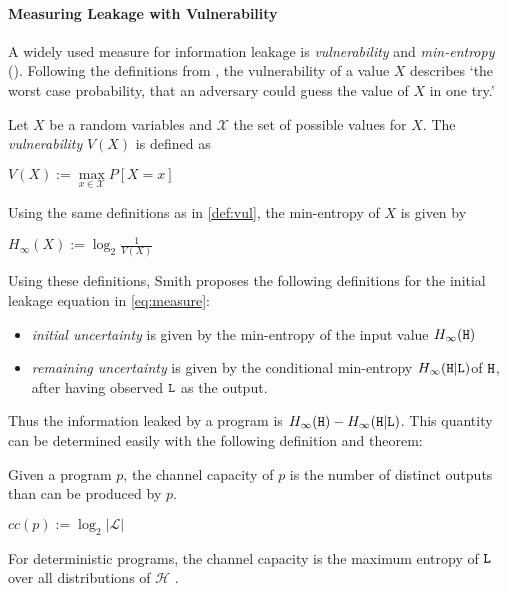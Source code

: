 \paragraph*{Measuring Leakage with Vulnerability}
A widely used measure for information leakage is \emph{vulnerability} and \emph{min-entropy} (). Following the definitions from \cite{smith09}, the vulnerability of a value $X$ describes `the worst case probability, that an adversary could guess the value of $X$ in one try.'

\begin{definition}[Vulnerability]\label{def:vul}
    Let $X$ be a random variables and $\mathcal{X}$ the set of possible values for $X$. The \emph{vulnerability} $V(X)$ is defined as
    \begin{center}
        $V(X) := \max\limits_{x \in \mathcal{X}} P[X = x]$
    \end{center}
\end{definition}

\begin{definition}
    Using the same definitions as in \ref{def:vul}, the min-entropy of $X$ is given by
    \begin{center}
        $H_\infty (X) := \log_2 \frac{1}{V(X)}$
    \end{center}
\end{definition}

Using these definitions, Smith \cite{smith09} proposes the following definitions for the initial leakage equation in \ref{eq:measure}:
\begin{itemize}
    \item \emph{initial uncertainty} is given by the min-entropy of the input value $H_\infty(\mathtt{H})$
    \item \emph{remaining uncertainty} is given by the conditional min-entropy $H_\infty(\mathtt{H} | \mathtt{L})$of $\mathtt{H}$, after having observed $\mathtt{L}$ as the output. 
\end{itemize}
Thus the information leaked by a program is $H_\infty(\mathtt{H}) - H_\infty(\mathtt{H} | \mathtt{L})$. This quantity can be determined easily with the following definition and theorem:

\begin{definition}
    Given a program $p$, the channel capacity of $p$ is the number of distinct outputs than can be produced by $p$.
    \begin{center}
        $cc(p) := \log_2 |\mathcal{L}|$
    \end{center}
    For deterministic programs, the channel capacity is the maximum entropy of $\mathtt{L}$ over all distributions of $\mathcal{H}$ \cite{smith09}.
\end{definition}

